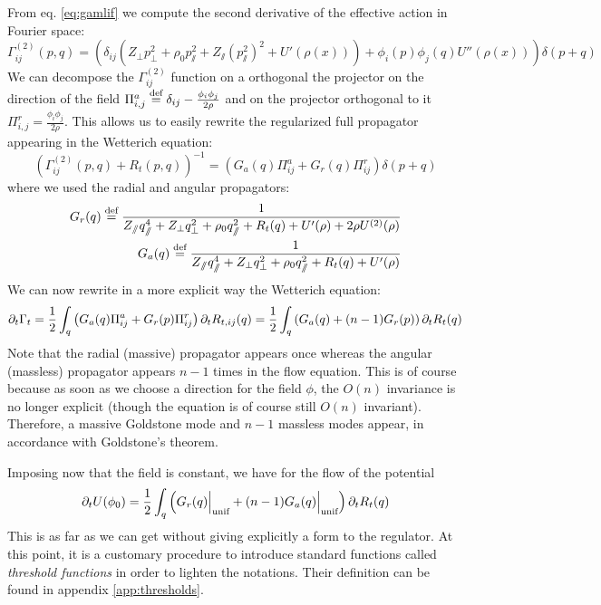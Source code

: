 From eq. \eqref{eq:gamlif} we compute the second derivative of the effective action in Fourier space:
\begin{equation}
\Gamma^{(2)}_{ij}(p,q) = 
\left( \delta_{ij} \left(Z_\perp p_{\perp}^2 +\rho_0 p_{\sslash}^2 +Z_\sslash (p_\sslash^2)^2 + U'(\rho (x))\right)+\phi_i(p) \phi_j(q) U''(\rho (x)) \right) \delta(p+q)
\end{equation}
We can decompose the $\Gamma^{(2)}_{ij}$ function on a orthogonal the projector on the direction of the field $\Pi^a_{i,j}  \overset{\text{def}}{=}  \delta_{ij} - \frac{\phi_i \phi_j}{2 \rho}$ and on the projector orthogonal to it$\Pi^r_{i,j} = \frac{\phi_i \phi_j}{2 \rho}$.
This allows us to easily rewrite the regularized full propagator appearing in the Wetterich equation:
\begin{equation}
\label{eq:gam2}
\left( \Gamma^{(2)}_{ij}(p,q) + R_t(p,q) \right)^{-1} = \left( G_a(q) \Pi^a_{ij} + G_r(q) \Pi^r_{ij} \right) \delta(p+q)
\end{equation}
where we used the radial and angular propagators:
\begin{align}
G_r(q)  \overset{\text{def}}{=}  \frac{1}{Z_\sslash q_\sslash^4 + Z_\perp q_\perp^2 + \rho_0 q_\sslash^2 + R_t(q)  + U'(\rho) + 2 \rho U^{(2)}(\rho)} \\
G_a(q)  \overset{\text{def}}{=}  \frac{1}{Z_\sslash q_\sslash^4 + Z_\perp q_\perp^2 + \rho_0 q_\sslash^2 + R_t(q) + U'(\rho)}
\end{align}
We can now rewrite in a more explicit way the Wetterich equation:
\begin{equation}
\partial_{t} \Gamma_t = \frac{1}{2} \int_q \left(  G_a(q) \Pi^a_{ij} + G_r(p) \Pi^r_{ij} \right) \partial_{t} R_{t,ij}(q)  = \frac{1}{2} \int_q \left(  G_a(q) + (n-1)G_r(p) \right) \partial_{t} R_{t}(q) 
\end{equation}
Note that the radial (massive) propagator appears once whereas the angular (massless) propagator appears $n-1$ times in the flow equation. This is of course because as soon as we choose a direction for the field $\phi$, the  $O(n)$ invariance is no longer explicit (though the equation is of course still $O(n)$ invariant). Therefore, a massive Goldstone mode and $n-1$ massless modes appear, in accordance with Goldstone's theorem.

Imposing now that the field is constant, we have for the flow of the potential
\begin{equation}
\partial_{t} U(\phi_0) = \frac{1}{2} \int_q \left( G_r(q) \Big|_{\text{unif}}  + (n-1)G_a(q) \Big|_{\text{unif}}  \right) \partial_{t} R_t(q)
\end{equation}
This is as far as we can get without giving explicitly a form to the regulator. 
At this point, it is a customary procedure to introduce standard functions called \textit{threshold functions} in order to lighten the notations. Their definition can be found in appendix \eqref{app:thresholds}.

